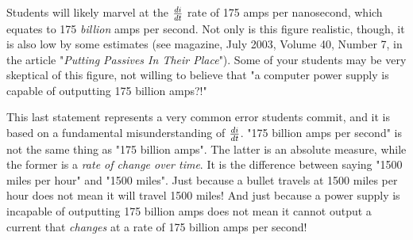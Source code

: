 
Students will likely marvel at the $di \over dt$ rate of 175 amps per nanosecond, which equates to 175 {\it billion} amps per second.  Not only is this figure realistic, though, it is also low by some estimates (see  magazine, July 2003, Volume 40, Number 7, in the article "{\it Putting Passives In Their Place}").  Some of your students may be very skeptical of this figure, not willing to believe that "a computer power supply is capable of outputting 175 billion amps?!"

This last statement represents a very common error students commit, and it is based on a fundamental misunderstanding of $di \over dt$.  "175 billion amps per second" is not the same thing as "175 billion amps".  The latter is an absolute measure, while the former is a {\it rate of change over time}.  It is the difference between saying "1500 miles per hour" and "1500 miles".  Just because a bullet travels at 1500 miles per hour does not mean it will travel 1500 miles!  And just because a power supply is incapable of outputting 175 billion amps does not mean it cannot output a current that {\it changes} at a rate of 175 billion amps per second!





